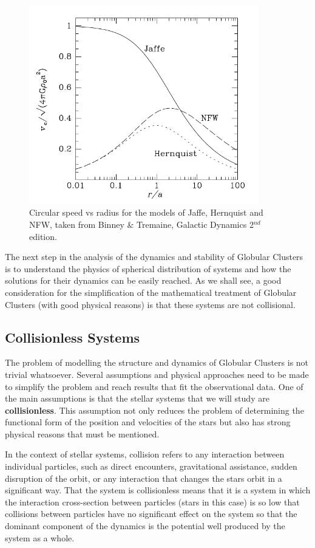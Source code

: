 \begin{figure}[H]
\centering
\includegraphics[width=10cm]{images/circular_velocity_vs_radius.png}
\caption[Circular speed vs radius for the Jaffe, Hernquist, and NFW models]{Circular speed vs radius for the models of Jaffe, Hernquist and NFW, taken from Binney \& Tremaine, Galactic Dynamics 2$^{nd}$ edition.}
\end{figure}

The next step in the analysis of the dynamics and stability of Globular Clusters is to understand the physics of spherical distribution of systems and how the solutions for their dynamics can be easily reached. As we shall see, a good consideration for the simplification of the mathematical treatment of Globular Clusters (with good physical reasons) is that these systems are not collisional.

\subsection{Collisionless Systems}

The problem of modelling the structure and dynamics of Globular Clusters is not trivial whatsoever. Several assumptions and physical approaches need to be made to simplify the problem and reach results that fit the observational data. One of the main assumptions is that the stellar systems that we will study are \textbf{collisionless}. This assumption not only reduces the problem of determining the functional form of the position and velocities of the stars but also has strong physical reasons that must be mentioned.

In the context of stellar systems, collision refers to any interaction between individual particles, such as direct encounters, gravitational assistance, sudden disruption of the orbit, or any interaction that changes the stars orbit in a significant way. That the system is collisionless means that it is a system in which the interaction cross-section between particles (stars in this case) is so low that collisions between particles have no significant effect on the system so that the dominant component of the dynamics is the potential well produced by the system as a whole.  

